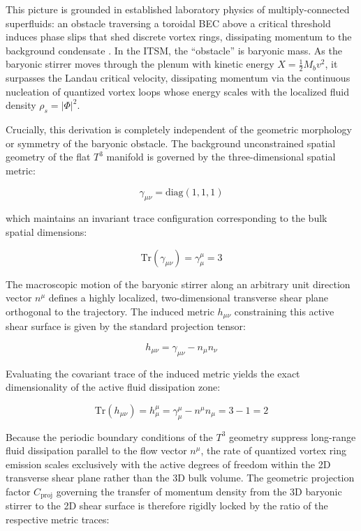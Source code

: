 \documentclass[aps,prd,10pt,twocolumn,superscriptaddress,nofootinbib,floatfix]{revtex4-2}
\begin{document}
This picture is grounded in established laboratory physics of multiply-connected superfluids: an obstacle traversing a toroidal BEC above a critical threshold induces phase slips that shed discrete vortex rings, dissipating momentum to the background condensate \cite{ryu_persistent_flow, ramanathan_weak_link}. In the ITSM, the ``obstacle'' is baryonic mass. As the baryonic stirrer moves through the plenum with kinetic energy $X = \frac{1}{2}M_b v^2$, it surpasses the Landau critical velocity, dissipating momentum via the continuous nucleation of quantized vortex loops whose energy scales with the localized fluid density $\rho_s = |\Phi|^2$.

Crucially, this derivation is completely independent of the geometric morphology or symmetry of the baryonic obstacle. The background unconstrained spatial geometry of the flat $T^3$ manifold is governed by the three-dimensional spatial metric:

\begin{equation}
\gamma_{\mu\nu} = \text{diag}(1, 1, 1)
\end{equation}

which maintains an invariant trace configuration corresponding to the bulk spatial dimensions:

\begin{equation}
\text{Tr}(\gamma_{\mu\nu}) = \gamma^\mu_\mu = 3
\end{equation}

The macroscopic motion of the baryonic stirrer along an arbitrary unit direction vector $n^\mu$ defines a highly localized, two-dimensional transverse shear plane orthogonal to the trajectory. The induced metric $h_{\mu\nu}$ constraining this active shear surface is given by the standard projection tensor:

\begin{equation}
h_{\mu\nu} = \gamma_{\mu\nu} - n_{\mu}n_{\nu}
\end{equation}

Evaluating the covariant trace of the induced metric yields the exact dimensionality of the active fluid dissipation zone:

\begin{equation}
\text{Tr}(h_{\mu\nu}) = h^\mu_\mu = \gamma^\mu_\mu - n^\mu n_\mu = 3 - 1 = 2
\end{equation}

Because the periodic boundary conditions of the $T^3$ geometry suppress long-range fluid dissipation parallel to the flow vector $n^\mu$, the rate of quantized vortex ring emission scales exclusively with the active degrees of freedom within the 2D transverse shear plane rather than the 3D bulk volume. The geometric projection factor $C_{\text{proj}}$ governing the transfer of momentum density from the 3D baryonic stirrer to the 2D shear surface is therefore rigidly locked by the ratio of the respective metric traces:
\end{document}
